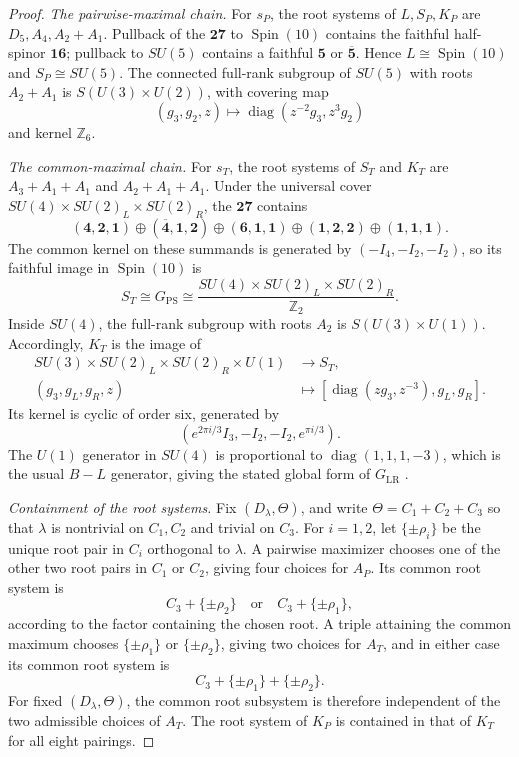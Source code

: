 \documentclass[11pt]{article}
\theoremstyle{remark}
\newcommand{\Klr}{G_{\mathrm{LR}}}
\newcommand{\Kps}{G_{\mathrm{PS}}}
\begin{document}
\begin{proof}
\emph{The pairwise-maximal chain.} For \(s_P\), the root systems of \(L,S_P,K_P\) are
\(D_5,A_4,A_2+A_1\). Pullback of the \(\mathbf{27}\) to
\(\operatorname{Spin}(10)\) contains the faithful half-spinor
\(\mathbf{16}\); pullback to \(SU(5)\) contains a faithful
\(\mathbf5\) or \(\overline{\mathbf5}\). Hence
\(L\cong\operatorname{Spin}(10)\) and \(S_P\cong SU(5)\). The connected
full-rank subgroup of \(SU(5)\) with roots \(A_2+A_1\) is
\(S(U(3)\times U(2))\), with covering map
\[
 (g_3,g_2,z)\longmapsto\operatorname{diag}(z^{-2}g_3,z^3g_2)
\]
and kernel \(\mathbb Z_6\).

\emph{The common-maximal chain.} For \(s_T\), the root systems of \(S_T\) and \(K_T\) are
\(A_3+A_1+A_1\) and \(A_2+A_1+A_1\). Under the universal cover
\(SU(4)\times SU(2)_L\times SU(2)_R\), the \(\mathbf{27}\) contains
\[
 (\mathbf4,\mathbf2,\mathbf1)
 \oplus(\overline{\mathbf4},\mathbf1,\mathbf2)
 \oplus(\mathbf6,\mathbf1,\mathbf1)
 \oplus(\mathbf1,\mathbf2,\mathbf2)
 \oplus(\mathbf1,\mathbf1,\mathbf1).
\]
The common kernel on these summands is generated by
\((-I_4,-I_2,-I_2)\), so its faithful image in
\(\operatorname{Spin}(10)\) is
\[
 S_T\cong\Kps\cong
 \frac{SU(4)\times SU(2)_L\times SU(2)_R}{\mathbb Z_2}.
\]
Inside \(SU(4)\), the full-rank subgroup with roots \(A_2\) is
\(S(U(3)\times U(1))\). Accordingly, \(K_T\) is the image of
\[
\begin{aligned}
 SU(3)\times SU(2)_L\times SU(2)_R\times U(1)
 &\longrightarrow S_T,\\
 (g_3,g_L,g_R,z)&\longmapsto
 [\operatorname{diag}(zg_3,z^{-3}),g_L,g_R].
\end{aligned}
\]
Its kernel is cyclic of order six, generated by
\[
 \left(e^{2\pi i/3}I_3,-I_2,-I_2,e^{\pi i/3}\right).
\]
The \(U(1)\) generator in \(SU(4)\) is proportional to
\(\operatorname{diag}(1,1,1,-3)\), which is the usual \(B-L\)
generator, giving the stated global form of \(\Klr\)
\cite{PatiSalam,Slansky,McKayPatera}.

\emph{Containment of the root systems.} Fix \((D_\lambda,\Theta)\), and write
\(\Theta=C_1+C_2+C_3\) so that \(\lambda\) is nontrivial on \(C_1,C_2\)
and trivial on \(C_3\). For \(i=1,2\), let
\(\{\pm\rho_i\}\) be the unique root pair in \(C_i\) orthogonal to
\(\lambda\). A pairwise maximizer chooses one of the other two root
pairs in \(C_1\) or \(C_2\), giving four choices for \(A_P\). Its
common root system is
\[
 C_3+\{\pm\rho_2\}
 \quad\text{or}\quad
 C_3+\{\pm\rho_1\},
\]
according to the factor containing the chosen root. A triple attaining the
common maximum chooses \(\{\pm\rho_1\}\) or
\(\{\pm\rho_2\}\), giving two choices for \(A_T\), and in either
case its common root system is
\[
 C_3+\{\pm\rho_1\}+\{\pm\rho_2\}.
\]
For fixed \((D_\lambda,\Theta)\), the common root subsystem is therefore
independent of the two admissible choices of \(A_T\). The root system of
\(K_P\) is contained in that of \(K_T\) for all eight pairings.


\end{proof}
\end{document}
